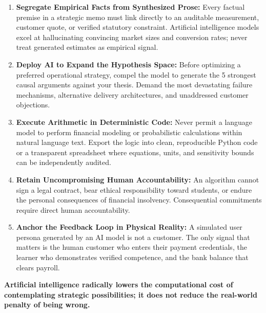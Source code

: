 \begin{enumerate}[leftmargin=12pt,itemsep=3pt,topsep=2pt,parsep=0pt]
  \item \textbf{Segregate Empirical Facts from Synthesized Prose:} Every factual premise in a strategic memo must link directly to an auditable measurement, customer quote, or verified statutory constraint. Artificial intelligence models excel at hallucinating convincing market sizes and conversion rates; never treat generated estimates as empirical signal.
  \item \textbf{Deploy AI to Expand the Hypothesis Space:} Before optimizing a preferred operational strategy, compel the model to generate the 5 strongest causal arguments against your thesis. Demand the most devastating failure mechanisms, alternative delivery architectures, and unaddressed customer objections.
  \item \textbf{Execute Arithmetic in Deterministic Code:} Never permit a language model to perform financial modeling or probabilistic calculations within natural language text. Export the logic into clean, reproducible Python code or a transparent spreadsheet where equations, units, and sensitivity bounds can be independently audited.
  \item \textbf{Retain Uncompromising Human Accountability:} An algorithm cannot sign a legal contract, bear ethical responsibility toward students, or endure the personal consequences of financial insolvency. Consequential commitments require direct human accountability.
  \item \textbf{Anchor the Feedback Loop in Physical Reality:} A simulated user persona generated by an AI model is not a customer. The only signal that matters is the human customer who enters their payment credentials, the learner who demonstrates verified competence, and the bank balance that clears payroll.
\end{enumerate}

\textbf{Artificial intelligence radically lowers the computational cost of contemplating strategic possibilities; it does not reduce the real-world penalty of being wrong.}
